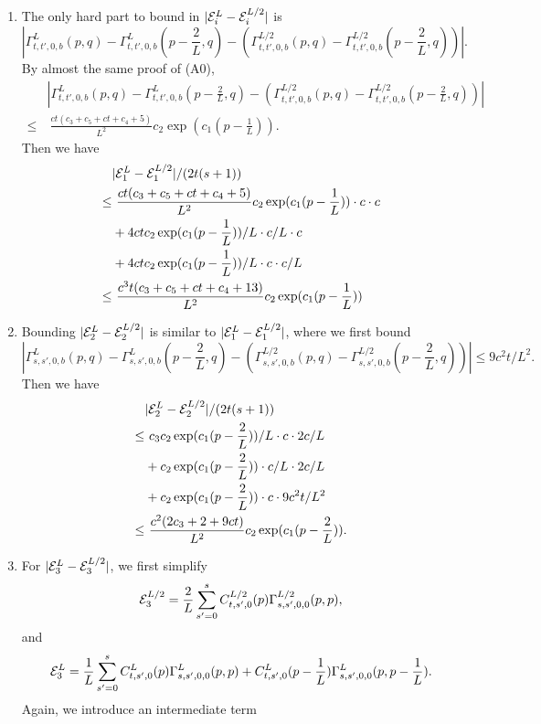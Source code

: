 \documentclass{article}
\theoremstyle{plain}
\theoremstyle{definition}
\begin{document}
\begin{enumerate}
    \item The only hard part to bound in $|\mathcal{E}_i^L-\mathcal{E}_i^{L/2}|$ is 
    \[|\Gamma^L_{t,t',0,b}(p,q) - \Gamma^L_{t,t',0,b}(p-\frac2L,q) - (\Gamma^{L/2}_{t,t',0,b}(p,q) - \Gamma^{L/2}_{t,t',0,b}(p-\frac2L,q))|.\]
    By almost the same proof of (A0), 
    \begin{align*}
        &|\Gamma^L_{t,t',0,b}(p,q) - \Gamma^L_{t,t',0,b}(p-\frac2L,q) - (\Gamma^{L/2}_{t,t',0,b}(p,q) - \Gamma^{L/2}_{t,t',0,b}(p-\frac2L,q))|\\
        \leq &~ \frac{ct(c_3+c_5+ct+c_4+5)}{L^2} c_2 \exp(c_1(p-\frac1L)).
    \end{align*}
    Then we have 
    \begin{align*}
        & |\mathcal{E}_1^L-\mathcal{E}_1^{L/2}| / (2t(s+1))\\
        \leq &~ \frac{ct(c_3+c_5+ct+c_4+5)}{L^2} c_2 \exp(c_1(p-\frac1L))\cdot c\cdot c\\
        & + 4ctc_2\exp(c_1(p-\frac1L))/L\cdot c/L \cdot c \\
        & + 4ctc_2\exp(c_1(p-\frac1L))/L\cdot c\cdot c/L\\
        \leq &~ \frac{c^3t(c_3+c_5+ct+c_4+13)}{L^2} c_2 \exp(c_1(p-\frac1L))
    \end{align*}
    \item Bounding $|\mathcal{E}_2^L-\mathcal{E}_2^{L/2}|$ is similar to $|\mathcal{E}_1^L-\mathcal{E}_1^{L/2}|$, where we first bound
    \[|\Gamma^L_{s,s',0,b}(p,q) - \Gamma^L_{s,s',0,b}(p-\frac2L,q) - (\Gamma^{L/2}_{s,s',0,b}(p,q) - \Gamma^{L/2}_{s,s',0,b}(p-\frac2L,q))|        \leq 9c^2t/L^2.\]
    Then we have 
    \begin{align*}
        & |\mathcal{E}_2^L-\mathcal{E}_2^{L/2}| / (2t(s+1))\\
        \leq &~ c_3c_2\exp(c_1(p-\frac2L))/L\cdot c\cdot 2c/L\\
        & + c_2\exp(c_1(p-\frac2L)) \cdot c / L \cdot 2c/L \\
        & + c_2\exp(c_1(p-\frac2L)) \cdot c \cdot 9c^2t/L^2\\
        \leq &~ \frac{c^2(2c_3+2+9ct)}{L^2} c_2 \exp(c_1(p-\frac2L)).
    \end{align*}
    \item For $|\mathcal{E}_3^L-\mathcal{E}_3^{L/2}|$, we first simplify \[\mathcal{E}_3^{L/2}=\frac2L\sum_{s'=0}^s C_{t,s',0}^{L/2}(p)\Gamma_{s,s',0,0}^{L/2}(p,p), \] and 
    \[\mathcal{E}_3^{L}=\frac1L\sum_{s'=0}^s C_{t,s',0}^{L}(p)\Gamma_{s,s',0,0}^{L}(p,p) + C_{t,s',0}^{L}(p-\frac1L)\Gamma_{s,s',0,0}^{L}(p,p-\frac1L).\]
    Again, we introduce an intermediate term 

\end{enumerate}
\end{document}

